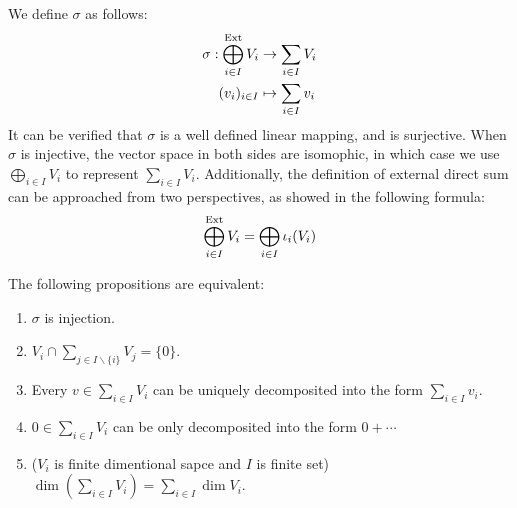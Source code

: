 We define $\sigma$ as follows:
\begin{align*}
    \sigma: \bigoplus^{\mathrm{Ext}}_{i \in I} V_i & \to \sum_{i \in I} V_i \\
    (v_i)_{i \in I} & \mapsto \sum_{i \in I} v_i
\end{align*}
It can be verified that $\sigma$ is a well defined linear mapping, and is surjective. When $\sigma$ is injective, the vector space in both sides are isomophic, in which case we use $\bigoplus_{i \in I} V_i$ to represent $\sum_{i \in I} V_i$. Additionally, the definition of external direct sum can be approached from two perspectives, as showed in the following formula:
\[
    \bigoplus^{\mathrm{Ext}}_{i \in I} V_i = \bigoplus_{i \in I} \iota_i (V_i)
\]






\begin{proposition}
    The following propositions are equivalent:
    \begin{enumerate}
        \item $\sigma$ is injection.
        \item $V_i \cap \sum_{j \in I \smallsetminus \{i\}} V_j = \{ 0 \}$.
        \item Every $v \in \sum_{i \in I} V_i$ can be uniquely decomposited into the form $\sum_{i \in I} v_i$.
        \item $0 \in \sum_{i \in I} V_i$ can be only decomposited into the form $0 + \cdots$
        \item ($V_i$ is finite dimentional sapce and $I$ is finite set) $\dim(\sum_{i \in I} V_i) = \sum_{i \in I} \dim V_i$.
    \end{enumerate}
\end{proposition}

